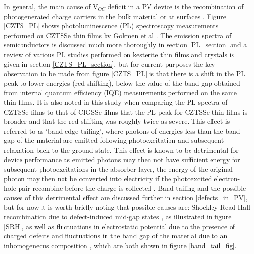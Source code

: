 In general, the main cause of V$_{OC}$ deficit in a PV device is the recombination of photogenerated charge carriers in the bulk material or at surfaces \cite{culprit}. 
Figure \ref{CZTS_PL} shows photoluminescence (PL) spectroscopy measurements performed on CZTSSe thin films by Gokmen et al \cite{band_tail}. The emission spectra of semiconductors is discussed much more thoroughly in section \ref{PL_section} and a review of various PL studies performed on kesterite thin films and crystals is given in section \ref{CZTS_PL_section}, but for current purposes the key observation to be made from figure \ref{CZTS_PL} is that there is a shift in the PL peak to lower energies (red-shifting), below the value of the band gap obtained from internal quantum efficiency (IQE) measurements performed on the same thin films. It is also noted in this study when comparing the PL spectra of CZTSSe films to that of CIGSSe films that the PL peak for CZTSSe thin films is broader and that the red-shifting was roughly twice as severe. This effect is referred to as `band-edge tailing', where photons of energies less than the band gap of the material are emitted following photoexcitation and subsequent relaxation back to the ground state. This effect is known to be detrimental for device performance as emitted photons may then not have sufficient energy for subsequent photoexcitations in the absorber layer, the energy of the original photon may then not be converted into electricity if the photoexcited electron-hole pair recombine before the charge is collected \cite{Nelson4}. Band tailing and the possible causes of this detrimental effect are discussed further in section \ref{defects_in_PV}, but for now it is worth briefly noting that possible causes are: Shockley-Read-Hall recombination due to defect-induced mid-gap states \cite{SRH}, as illustrated in figure \ref{SRH}, as well as fluctuations in electrostatic potential due to the presence of charged defects and fluctuations in the band gap of the material due to an inhomogeneous composition \cite{band_tail}, which are both shown in figure \ref{band_tail_fig}.\\


